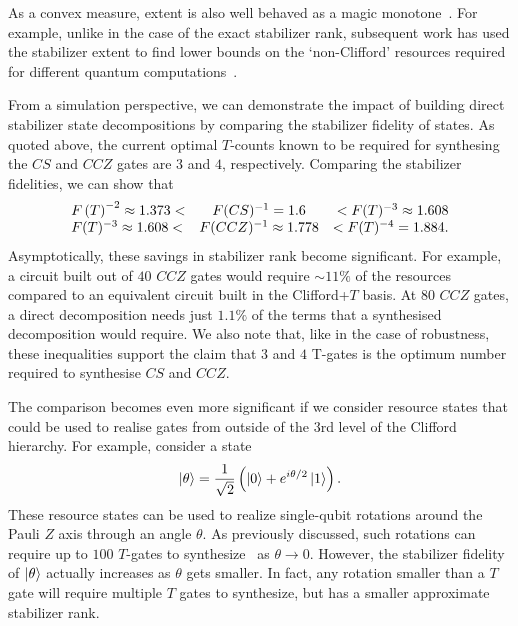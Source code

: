 As a convex measure, extent is also well behaved as a magic monotone~\cite{Regula2018}. For example, unlike in the case of the exact stabilizer rank, subsequent work has used the stabilizer extent to find lower bounds on the `non-Clifford' resources required for different quantum computations~\cite{Beverland2019}.\par
From a simulation perspective, we can demonstrate the impact of building direct stabilizer state decompositions by comparing the stabilizer fidelity of states. As quoted above, the current optimal $T$-counts known to be required for synthesing the $CS$ and $CCZ$ gates are $3$ and $4$, respectively. Comparing the stabilizer fidelities, we can show that
\begin{equation}
\begin{array}{l c r}
F\left(T\right)^{-2}\approx 1.373< & F(CS)^{-1}=1.6 &< F(T)^{-3}\approx 1.608 \\
F(T)^{-3}\approx 1.608< & F(CCZ)^{-1}\approx 1.778 &< F(T)^{-4}=1.884.
\end{array}
\label{eq:c3_resource_comparison}
\end{equation}
Asymptotically, these savings in stabilizer rank become significant. For example, a circuit built out of $40$ $CCZ$ gates would require $\sim 11\%$ of the resources compared to an equivalent circuit built in the Clifford+$T$ basis. At $80$ $CCZ$ gates, a direct decomposition needs just  $1.1\%$ of the terms that a synthesised decomposition would require. We also note that, like in the case of robustness, these inequalities support the claim that $3$ and $4$ T-gates is the optimum number required to synthesise $CS$ and $CCZ$.\par
The comparison becomes even more significant if we consider resource states that could be used to realise gates from outside of the $3$rd level of the Clifford hierarchy. For example, consider a state
\begin{equation}
\ket{\theta}=\frac{1}{\sqrt{2}}\left(\ket{0}+e^{i\theta/2}\ket{1}\right).
\label{eq:theta_state}
\end{equation}
These resource states can be used to realize single-qubit rotations around the Pauli $Z$ axis through an angle $\theta$. As previously discussed, such rotations can require up to $100$ $T$-gates to synthesize~\cite{Ross2014} as $\theta\rightarrow 0$. However, the stabilizer fidelity of $\ket{\theta}$ actually increases as $\theta$ gets smaller. In fact, any rotation smaller than a $T$ gate will require multiple $T$ gates to synthesize, but has a smaller approximate stabilizer rank. \par
